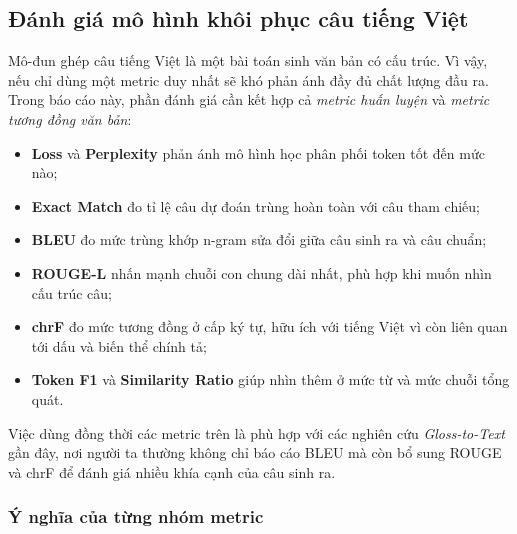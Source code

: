 ﻿\subsection{Đánh giá mô hình khôi phục câu tiếng Việt}

Mô-đun ghép câu tiếng Việt là một bài toán sinh văn bản có cấu trúc. Vì vậy, nếu chỉ dùng
một metric duy nhất sẽ khó phản ánh đầy đủ chất lượng đầu ra. Trong báo cáo này, phần
đánh giá cần kết hợp cả \textit{metric huấn luyện} và \textit{metric tương đồng văn bản}:
\begin{itemize}
    \item \textbf{Loss} và \textbf{Perplexity} phản ánh mô hình học phân phối token tốt đến
    mức nào;
    \item \textbf{Exact Match} đo tỉ lệ câu dự đoán trùng hoàn toàn với câu tham chiếu;
    \item \textbf{BLEU} đo mức trùng khớp n-gram sửa đổi giữa câu sinh ra và câu chuẩn;
    \item \textbf{ROUGE-L} nhấn mạnh chuỗi con chung dài nhất, phù hợp khi muốn nhìn cấu
    trúc câu;
    \item \textbf{chrF} đo mức tương đồng ở cấp ký tự, hữu ích với tiếng Việt vì còn liên quan
    tới dấu và biến thể chính tả;
    \item \textbf{Token F1} và \textbf{Similarity Ratio} giúp nhìn thêm ở mức từ và mức chuỗi
    tổng quát.
\end{itemize}

Việc dùng đồng thời các metric trên là phù hợp với các nghiên cứu \textit{Gloss-to-Text}
gần đây, nơi người ta thường không chỉ báo cáo BLEU mà còn bổ sung ROUGE và chrF để
đánh giá nhiều khía cạnh của câu sinh ra.

\subsubsection{Ý nghĩa của từng nhóm metric}

